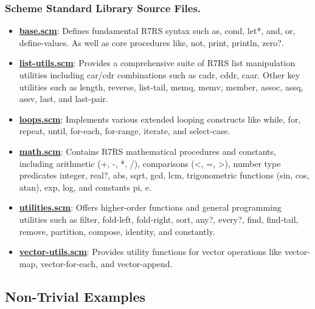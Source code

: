 \documentclass[final]{cmpreport_02}
\begin{document}
\subsubsection*{Scheme Standard Library Source Files.}
\label{tab:stdlib}
\begin{itemize}
    \item \textbf{\href{https://github.com/jamie-wales/Jaws/blob/main/lib/base.scm}{base.scm}}: Defines fundamental R7RS syntax such as, cond, let*, and, or, define-values. As well as core procedures like, not, print, println, zero?.
    \item \textbf{\href{https://github.com/jamie-wales/Jaws/blob/main/lib/list-utils.scm}{list-utils.scm}}: Provides a comprehensive suite of R7RS list manipulation utilities including car/cdr combinations such as cadr, cddr, caar. Other key utilities such as length, reverse, list-tail, memq, memv, member, assoc, assq, assv, last, and last-pair.
    \item \textbf{\href{https://github.com/jamie-wales/Jaws/blob/main/lib/loops.scm}{loops.scm}}: Implements various extended looping constructs like while, for, repeat, until, for-each, for-range, iterate, and select-case.
    \item \textbf{\href{https://github.com/jamie-wales/Jaws/blob/main/lib/math.scm}{math.scm}}: Contains R7RS mathematical procedures and constants, including arithmetic (+, -, *, /), comparisons (<, =, >), number type predicates integer, real?, abs, sqrt, gcd, lcm, trigonometric functions (sin, cos, atan), exp, log, and constants pi, e.
    \item \textbf{\href{https://github.com/jamie-wales/Jaws/blob/main/lib/utilities.scm}{utilities.scm}}: Offers higher-order functions and general programming utilities such as filter, fold-left, fold-right, sort, any?, every?, find, find-tail, remove, partition, compose, identity, and constantly.
    \item \textbf{\href{https://github.com/jamie-wales/Jaws/blob/main/lib/vector-utils.scm}{vector-utils.scm}}: Provides utility functions for vector operations like vector-map, vector-for-each, and vector-append.
\end{itemize}

\subsection{Non-Trivial Examples}
\end{document}
